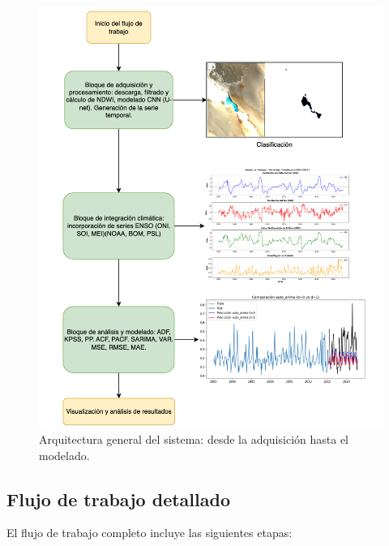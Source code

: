 \begin{figure}[htpb] 
    \centering 
    \includegraphics[scale=.4]{Figures/Arqui_TTFB3.png} 
    \caption{Arquitectura general del sistema: desde la adquisición hasta el modelado.} 
    \label{fig:arquitectura_general} 
\end{figure}

\subsection*{Flujo de trabajo detallado}

El flujo de trabajo completo incluye las siguientes etapas:

